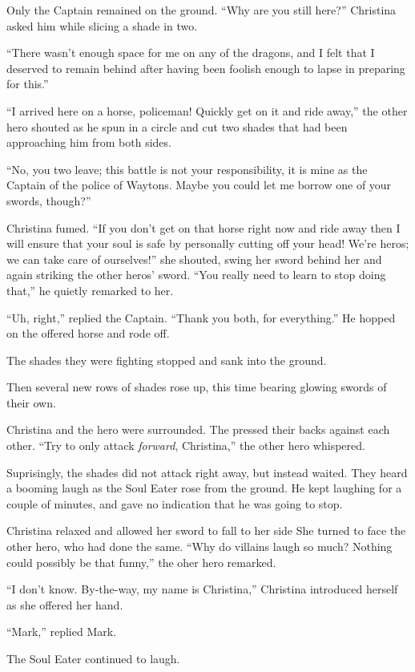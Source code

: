 \documentclass[showtrims,b6paper,draft,10pt]{memoir}
\begin{document}
Only the Captain remained on the ground.  ``Why are you still here?'' Christina asked him while slicing a shade in two.

``There wasn't enough space for me on any of the dragons, and I felt that I deserved to remain behind after having been foolish enough to lapse in preparing for this.''

``I arrived here on a horse, policeman!  Quickly get on it and ride away,'' the other hero shouted as he spun in a circle and cut two shades that had been approaching him from both sides.

``No, you two leave;  this battle is not your responsibility, it is mine as the Captain of the police of Waytons.  Maybe you could let me borrow one of your swords, though?''

Christina fumed.  ``If you don't get on that horse right now and ride away then I will ensure that your soul is safe by personally cutting off your head!  We're heros;  we can take care of ourselves!'' she shouted, swing her sword behind her and again striking the other heros' sword.  ``You really need to learn to stop doing that,''  he quietly remarked to her.

``Uh, right,'' replied the Captain.  ``Thank you both, for everything.''  He hopped on the offered horse and rode off.

The shades they were fighting stopped and sank into the ground.

Then several new rows of shades rose up, this time bearing glowing swords of their own.

Christina and the hero were surrounded.  The pressed their backs against each other.  ``Try to only attack \emph{forward}, Christina,'' the other hero whispered.

Suprisingly, the shades did not attack right away, but instead waited.  They heard a booming laugh as the Soul Eater rose from the ground.  He kept laughing for a couple of minutes, and gave no indication that he was going to stop.

Christina relaxed and allowed her sword to fall to her side  She turned to face the other hero, who had done the same.  ``Why do villains laugh so much?  Nothing could possibly be that funny,'' the oher hero remarked.

``I don't know.  By-the-way, my name is Christina,'' Christina introduced herself as she offered her hand.

``Mark,'' replied Mark.

The Soul Eater continued to laugh.
\end{document}
